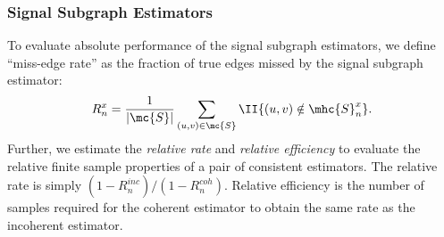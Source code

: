 \documentclass[10pt,journal,cspaper,compsoc]{IEEEtran}
\begin{document}
\subsubsection{Signal Subgraph Estimators} %
\label{ssub:signal_subgraph_estimators}


To evaluate absolute performance of the signal subgraph estimators, we define  ``miss-edge rate'' as the fraction of true edges missed by the signal subgraph estimator:
\begin{align}
R^x_n = \frac{1}{|\mc{S}|} \sum_{(u,v)\in \mc{S}}\II\{(u,v) \notin \mhc{S}^x_n\}.
\end{align}
Further, we estimate the \emph{relative rate} and \emph{relative efficiency} to evaluate the relative finite sample properties of a pair of consistent estimators. The relative rate is simply $(1-R^{inc}_n)/(1-R^{coh}_n)$.  Relative efficiency is the number of samples required for the coherent estimator to obtain the same rate as the incoherent estimator.


% 




% 
% 
% 
% 
% 
\end{document}
